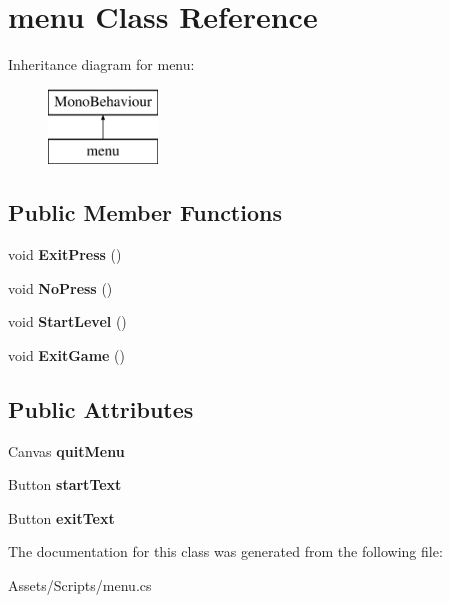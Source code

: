 \hypertarget{classmenu}{}\section{menu Class Reference}
\label{classmenu}
Inheritance diagram for menu\+:\begin{figure}[H]
\begin{center}
\leavevmode
\includegraphics[height=2.000000cm]{classmenu}
\end{center}
\end{figure}
\subsection*{Public Member Functions}
\begin{DoxyCompactItemize}
\item 
void {\bfseries Exit\+Press} ()\hypertarget{classmenu_a2dd506a78a3b85b52f7e89d2e22ff0e4}{}\label{classmenu_a2dd506a78a3b85b52f7e89d2e22ff0e4}

\item 
void {\bfseries No\+Press} ()\hypertarget{classmenu_a92d752ec5a88de7c2beef0ef27df6c26}{}\label{classmenu_a92d752ec5a88de7c2beef0ef27df6c26}

\item 
void {\bfseries Start\+Level} ()\hypertarget{classmenu_a824aa861449f137ab3b8dc8d63d44ab2}{}\label{classmenu_a824aa861449f137ab3b8dc8d63d44ab2}

\item 
void {\bfseries Exit\+Game} ()\hypertarget{classmenu_ac054ced4ef2cae218a1d6b64ee1600a2}{}\label{classmenu_ac054ced4ef2cae218a1d6b64ee1600a2}

\end{DoxyCompactItemize}
\subsection*{Public Attributes}
\begin{DoxyCompactItemize}
\item 
Canvas {\bfseries quit\+Menu}\hypertarget{classmenu_a225342d46067d7b47f96f33b8fdb5216}{}\label{classmenu_a225342d46067d7b47f96f33b8fdb5216}

\item 
Button {\bfseries start\+Text}\hypertarget{classmenu_afd045bf4b6b334380f29f985c59da14f}{}\label{classmenu_afd045bf4b6b334380f29f985c59da14f}

\item 
Button {\bfseries exit\+Text}\hypertarget{classmenu_a07b6ccc44f63d87911b2b2170479ea7a}{}\label{classmenu_a07b6ccc44f63d87911b2b2170479ea7a}

\end{DoxyCompactItemize}


The documentation for this class was generated from the following file\+:\begin{DoxyCompactItemize}
\item 
Assets/\+Scripts/menu.\+cs\end{DoxyCompactItemize}
